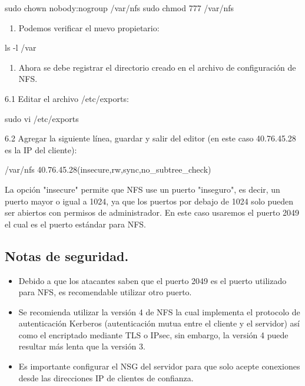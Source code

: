 \begin{SourceCode}
sudo chown nobody:nogroup /var/nfs
sudo chmod 777 /var/nfs
\end{SourceCode}

\begin{enumerate}
\item Podemos verificar el nuevo propietario:
\end{enumerate}

\begin{SourceCode}
ls -l /var
\end{SourceCode}

\begin{enumerate}
\item Ahora se debe registrar el directorio creado en el archivo de configuración de NFS.
\end{enumerate}

6.1 Editar el archivo /etc/exports:

\begin{SourceCode}
sudo vi /etc/exports
\end{SourceCode}

6.2 Agregar la siguiente línea, guardar y salir del editor (en este caso 40.76.45.28 es la IP del cliente):

\begin{SourceCode}
/var/nfs 40.76.45.28(insecure,rw,sync,no_subtree_check)
\end{SourceCode}

La opción "insecure" permite que NFS use un puerto "inseguro", es decir, un puerto mayor o igual a 1024, ya que los puertos por debajo de 1024 solo pueden ser abiertos con permisos de administrador. En este caso usaremos el puerto 2049 el cual es el puerto estándar para NFS.

\subsection{Notas de seguridad.}

\begin{itemize}
\item Debido a que los atacantes saben que el puerto 2049 es el puerto utilizado para NFS, es recomendable utilizar otro puerto.
\item Se recomienda utilizar la versión 4 de NFS la cual implementa el protocolo de autenticación Kerberos (autenticación mutua entre el cliente y el servidor) así como el encriptado mediante TLS o IPsec, sin embargo, la versión 4 puede resultar más lenta que la versión 3.
\item Es importante configurar el NSG del servidor para que solo acepte conexiones desde las direcciones IP de clientes de confianza.
\end{itemize}

